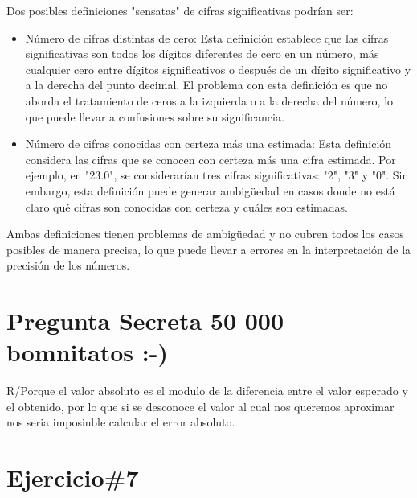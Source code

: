 \documentclass[a4paper,12pt]{article}
\begin{document}
Dos posibles definiciones "sensatas" de cifras significativas podrían ser:
\begin{itemize}
    \item Número de cifras distintas de cero: Esta definición establece que las cifras significativas 
son todos los dígitos diferentes de cero en un número, más cualquier cero entre dígitos significativos
o después de un dígito significativo y a la derecha del punto decimal. El problema con esta definición
es que no aborda el tratamiento de ceros a la izquierda o a la derecha del número, lo que puede llevar
a confusiones sobre su significancia.
    \item Número de cifras conocidas con certeza más una estimada: Esta definición considera las cifras 
que se conocen con certeza más una cifra estimada. Por ejemplo, en "23.0", se considerarían tres cifras 
significativas: "2", "3" y "0". Sin embargo, esta definición puede generar ambigüedad en casos donde no 
está claro qué cifras son conocidas con certeza y cuáles son estimadas.

\end{itemize}

Ambas definiciones tienen problemas de ambigüedad y no cubren todos los casos posibles de manera precisa, 
lo que puede llevar a errores en la interpretación de la precisión de los números.

\section*{Pregunta Secreta 50 000 bomnitatos :-)}

R/Porque el valor absoluto es el modulo de la diferencia entre el valor esperado y el obtenido, por lo que si se desconoce el valor
al cual nos queremos aproximar nos seria imposinble calcular el error absoluto.

\section*{Ejercicio\#7}
\end{document}
